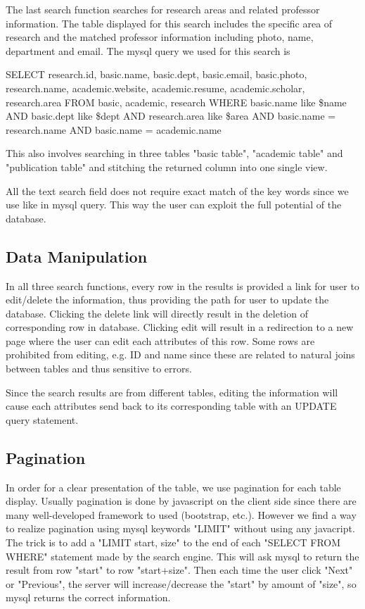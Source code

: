 \documentclass[authoryear,preprint,final,12pt]{elsarticle}
\begin{document}
The last search function searches for research areas and related professor information. The table displayed for this search includes the specific area of research and the matched professor information including photo, name, department and email. The mysql query we used for this search is 
\begin{displayquote}
    SELECT research.id, basic.name, basic.dept, basic.email, basic.photo, research.name, academic.website, academic.resume, academic.scholar, research.area FROM basic, academic, research WHERE basic.name like \$name AND basic.dept like \$dept AND research.area like \$area AND basic.name = research.name AND basic.name = academic.name 
\end{displayquote}
This also involves searching in three tables "basic table", "academic table" and "publication table" and stitching the returned column into one single view.

All the text search field does not require exact match of the key words since we use like in mysql query. This way the user can exploit the full potential of the database.

\subsection{Data Manipulation}
In all three search functions, every row in the results is provided a link for user to edit/delete the information, thus providing the path for user to update the database. Clicking the delete link will directly result in the deletion of corresponding row in database. Clicking edit will result in a redirection to a new page where the user can edit each attributes of this row. Some rows are prohibited from editing, e.g. ID and name since these are related to natural joins between tables and thus sensitive to errors.

Since the search results are from different tables, editing the information will cause each attributes send back to its corresponding table with an UPDATE query statement.

\subsection{Pagination}
In order for a clear presentation of the table, we use pagination for each table display. Usually pagination is done by javascript on the client side since there are many well-developed framework to used (bootstrap, etc.). However we find a way to realize pagination using mysql keywords "LIMIT" without using any javacript. The trick is to add a "LIMIT start, size" to the end of each "SELECT FROM WHERE" statement made by the search engine. This will ask mysql to return the result from row "start" to row "start+size". Then each time the user click "Next" or "Previous", the server will increase/decrease the "start" by amount of "size", so mysql returns the correct information.
\end{document}

